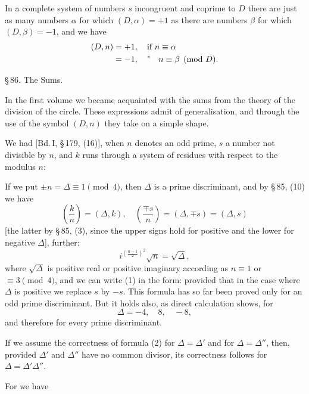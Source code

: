In a complete system of numbers $s$ incongruent and coprime to $D$ there are just as many numbers $\alpha$ for which $(D, \alpha) = +1$ as there are numbers $\beta$ for which $(D, \beta) = -1$, and we have
\[
\begin{aligned}
(D,n) &= +1, \quad \text{if } n \equiv \alpha \\
&= -1, \quad \text{\textquotedbl} \quad n \equiv \beta \pmod{D}.
\end{aligned}
\]

\begin{center}
\S\,86. The  Sums.
\end{center}

In the first volume we became acquainted with the  sums from the theory of the division of the circle. These expressions admit of generalisation, and through the use of the symbol $(D, n)$ they take on a simple shape.

We had [Bd.\,I, \S\,179, (16)], when $n$ denotes an odd prime, $s$ a number not divisible by $n$, and $k$ runs through a system of residues with respect to the modulus $n$:

If we put $\pm n = \varDelta \equiv 1 \pmod{4}$, then $\varDelta$ is a prime discriminant, and by \S\,85, (10) we have
\[
\left(\frac{k}{n}\right) = (\varDelta, k), \quad \left(\frac{\mp s}{n}\right) = (\varDelta, \mp s) = (\varDelta, s)
\]
[the latter by \S\,85, (3), since the upper signs hold for positive and the lower for negative $\varDelta$], further:
\[
i^{\left(\frac{n-1}{2}\right)^2} \sqrt{n} = \sqrt{\varDelta},
\]
where $\sqrt{\varDelta}$ is positive real or positive imaginary according as $n \equiv 1$ or $\equiv 3 \pmod{4}$, and we can write (1) in the form:
provided that in the case where $\varDelta$ is positive we replace $s$ by $-s$. This formula has so far been proved only for an odd prime discriminant. But it holds also, as direct calculation shows, for
\[
\varDelta = -4, \quad 8, \quad -8,
\]
and therefore for every prime discriminant.

If we assume the correctness of formula (2) for $\varDelta = \varDelta'$ and for $\varDelta = \varDelta''$, then, provided $\varDelta'$ and $\varDelta''$ have no common divisor, its correctness follows for $\varDelta = \varDelta' \varDelta''$.

For we have

